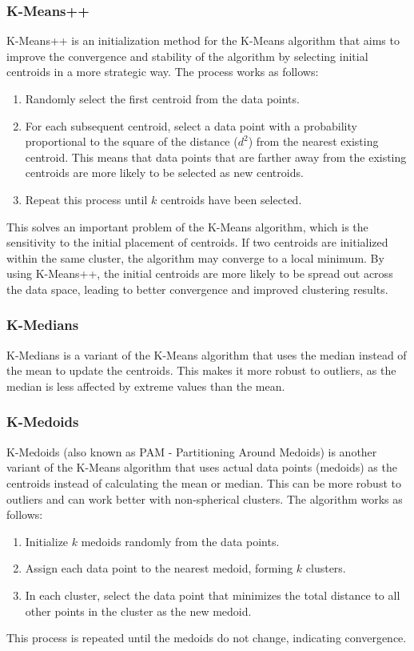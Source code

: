 \subsubsection{K-Means++}
K-Means++ is an initialization method for the K-Means algorithm that aims to improve the convergence and stability of the algorithm by selecting initial centroids in a more strategic way. The process works as follows:
\begin{enumerate}
    \item Randomly select the first centroid from the data points.
    \item For each subsequent centroid, select a data point with a probability proportional to the square of the distance ($d^2$) from the nearest existing centroid. This means that data points that are farther away from the existing centroids are more likely to be selected as new centroids.
    \item Repeat this process until $k$ centroids have been selected.
\end{enumerate}

This solves an important problem of the K-Means algorithm, which is the sensitivity to the initial placement of centroids. If two centroids are initialized within the same cluster, the algorithm may converge to a local minimum. By using K-Means++, the initial centroids are more likely to be spread out across the data space, leading to better convergence and improved clustering results.

\subsubsection{K-Medians}

K-Medians is a variant of the K-Means algorithm that uses the median instead of the mean to update the centroids. This makes it more robust to outliers, as the median is less affected by extreme values than the mean.

\subsubsection{K-Medoids}

K-Medoids (also known as PAM - Partitioning Around Medoids) is another variant of the K-Means algorithm that uses actual data points (medoids) as the centroids instead of calculating the mean or median. This can be more robust to outliers and can work better with non-spherical clusters. The algorithm works as follows:
\begin{enumerate}
    \item Initialize $k$ medoids randomly from the data points.
    \item Assign each data point to the nearest medoid, forming $k$ clusters.
    \item In each cluster, select the data point that minimizes the total distance to all other points in the cluster as the new medoid.
\end{enumerate}
This process is repeated until the medoids do not change, indicating convergence.

